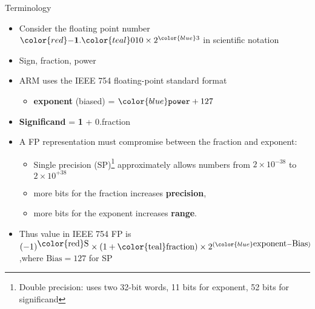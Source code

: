 \begin{frame}{Terminology}
\begin{itemize}
     \item  Consider the floating point number ${\color{red}-}\textbf{1}.{\color{teal}010} \times 2^{\color{blue}3}$ in scientific notation
     \item {\color{red}Sign}, {\color{teal}fraction}, {\color{blue} power}
     
     \item ARM uses the IEEE 754 floating-point standard format
     \begin{multicols}{2}
         
\begin{center}
\end{center}

\columnbreak
\begin{itemize}
\item \textbf{exponent} (biased) = ${\color{blue} \texttt{power}} + 127$
     
\end{itemize}
 
     \end{multicols}
\item \textbf{Significand} = \textbf{1} + 0.{\color{teal}fraction}
     \item A FP representation must compromise between the fraction and exponent:
\begin{itemize}
\item Single precision (SP)\footnote{Double precision: uses two 32-bit words, 11 bits for exponent,
52 bits for significand} approximately allows numbers from $2 \times 10^{-38}$ to $2 \times 10^{+38}$
\item more bits for the fraction increases \textbf{precision},
\item more bits for the exponent increases \textbf{range}.
\end{itemize}

\item Thus value in IEEE 754 FP is $(-1)^{\mbox{\color{red}S}} \times (1 +
\mbox{{\color{teal}fraction}}) \times 2^{({\color{blue}\mbox{exponent} - \mbox{Bias}})}$,{\footnotesize where $\mbox{Bias}=127$ for SP}
\end{itemize}

\end{frame}

